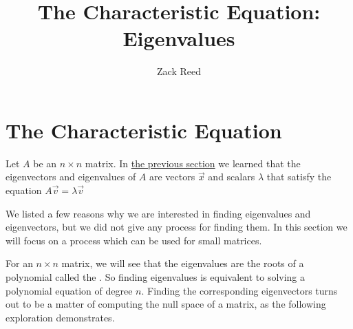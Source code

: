 \documentclass{ximera}
\author{Zack Reed}
\title{The Characteristic Equation: Eigenvalues}
\begin{document}
\begin{abstract}

\end{abstract}
\maketitle


\section*{The Characteristic Equation}

    
Let $A$ be an $n \times n$ matrix.  In \href{https://ximera.osu.edu/appliedlinearalgebra/c7ChapterSeven/learningActivities/m7LearningActivities/m7EigenStuff/describingEigenstuff}{the previous section} we learned that the eigenvectors and eigenvalues of $A$ are vectors $\vec{x}$ and scalars $\lambda$ that satisfy the equation 
$A \vec{v} = \lambda \vec{v}$

We listed a few reasons why we are interested in finding eigenvalues and eigenvectors, but we did not give any process for finding them.  In this section we will focus on a process which can be used for small matrices.  %
    
For an $n \times n$ matrix, we will see that the eigenvalues are the roots of a polynomial called the .  So finding eigenvalues is equivalent to solving a polynomial equation of degree $n$.  Finding the corresponding eigenvectors turns out to be a matter of computing the null space of a matrix, as the following exploration demonstrates.
    
\end{document}
